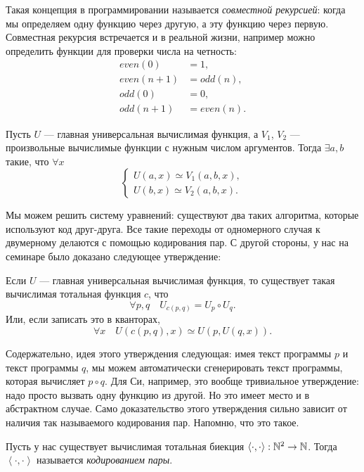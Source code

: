 Такая концепция в программировании называется {\it совместной рекурсией}: когда мы определяем одну функцию через другую, а эту функцию через первую.
Совместная рекурсия встречается и в реальной жизни, например можно определить функции для проверки числа на четность:
\begin{align}
    even(0) &= 1, \\
    even(n + 1) &= odd(n), \\
    odd(0) &= 0, \\
    odd(n + 1) &= even(n).
\end{align}

\begin{theorem}
    Пусть $U$ --- главная универсальная вычислимая функция, а $V_{1}$, $V_{2}$ --- произвольные вычислимые функции с нужным числом аргументов.
    Тогда $\exists a, b$ такие, что $\forall x$
    $$
        \begin{cases}
            U(a, x) \simeq V_{1}\left(a, b, x\right), \\
            U(b, x) \simeq V_{2}\left(a, b, x\right).
        \end{cases}
    $$
\end{theorem}

Мы можем решить систему уравнений: существуют два таких алгоритма, которые используют код друг-друга.
Все такие переходы от одномерного случая к двумерному делаются с помощью кодирования пар.
С другой стороны, у нас на семинаре было доказано следующее утверждение:

\begin{statement}
    Если $U$ --- главная универсальная вычислимая функция, то существует такая вычислимая тотальная функция $c$, что
    $$
        \forall p, q \quad U_{c\left(p, q\right)} = U_{p} \circ U_{q}.
    $$
    Или, если записать это в кванторах,
    $$
        \forall x \quad U\left(c(p, q), x\right) \simeq  U(p, U(q, x)).
    $$
\end{statement}

Содержательно, идея этого утверждения следующая: имея текст программы $p$ и текст программы $q$, мы можем автоматически сгенерировать текст программы, которая вычисляет $p \circ q$.
Для Си, например, это вообще тривиальное утверждение: надо просто вызвать одну функцию из другой.
Но это имеет место и в абстрактном случае.
Само доказательство этого утверждения сильно зависит от наличия так называемого кодирования пар.
Напомню, что это такое.
\begin{definition}
    Пусть у нас существует вычислимая тотальная биекция $\left\langle \cdot, \cdot \right\rangle:  \mathbb{N}^{2} \to \mathbb{N}$.
    Тогда $\left\langle \cdot, \cdot \right\rangle$ называется {\it кодированием пары}.
\end{definition}

